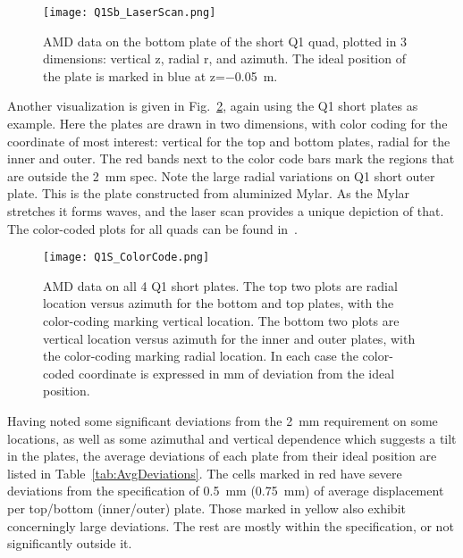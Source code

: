 \begin{figure}[]
	\centering
	\texttt{[image: Q1Sb\_LaserScan.png]}
	\caption{AMD data on the bottom plate of the short Q1 quad, plotted in 3 dimensions: vertical z, radial r, and azimuth. The ideal position of the plate is marked in blue at z=\SI{-0.05}{m}.}\label{fig:Q1Sb_LaserScan}
\end{figure}

Another visualization is given in Fig.~\ref{fig:Q1S_ColorCode}, again using the Q1 short plates as example. Here the plates are drawn in two dimensions, with color coding for the coordinate of most interest: vertical for the top and bottom plates, radial for the inner and outer. 
The red bands next to the color code bars mark the regions that are outside the \SI{2}{mm} spec.
Note the large radial variations on Q1 short outer plate. This is the plate constructed from aluminized Mylar. As the Mylar stretches it forms waves, and the laser scan provides a unique depiction of that. %
The color-coded plots for all quads can be found in~\cite{Kargiantoulakis:doc12906}.

\begin{figure}[t]
	\centering
	\texttt{[image: Q1S\_ColorCode.png]}
	\caption{AMD data on all 4 Q1 short plates. 
	The top two plots are radial location versus azimuth for the bottom and top plates, with the color-coding marking vertical location. 
	The bottom two plots are vertical location versus azimuth for the inner and outer plates, with the color-coding marking radial location. 
	In each case the color-coded coordinate is expressed in mm of deviation from the ideal position.}\label{fig:Q1S_ColorCode}
\end{figure}


Having noted some significant deviations from the \SI{2}{mm} requirement on some locations, as well as some azimuthal and vertical dependence which suggests a tilt in the plates, the average deviations of each plate from their ideal position are listed in Table~\ref{tab:AvgDeviations}.
The cells marked in red have severe deviations from the specification of \SI{0.5}{mm} (\SI{0.75}{mm}) of average displacement per top/bottom (inner/outer) plate. 
Those marked in yellow also exhibit concerningly large deviations. The rest are mostly within the specification, or not significantly outside it.

